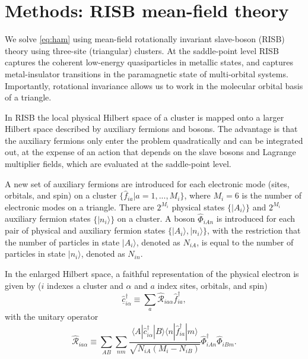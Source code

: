 \documentclass[reprint,aps,prb,amsmath,amssymb]{revtex4-2}
\begin{document}

\section{Methods: RISB mean-field theory} \label{sec:risb}

We solve \cref{eq:ham} using mean-field rotationally invariant slave-boson (RISB) theory \cite{Kotliar1986,Lechermann2007,Lanata2015,Lanata2017} using three-site (triangular) clusters. At the saddle-point level RISB captures the coherent low-energy quasiparticles in metallic states, and captures metal-insulator transitions in the paramagnetic state of multi-orbital systems. Importantly, rotational invariance allows us to work in the molecular orbital basis of a triangle.  %

In RISB the local physical Hilbert space of a cluster is mapped onto a larger Hilbert space described by auxiliary fermions and bosons. The advantage is that the auxiliary fermions only enter the problem quadratically and can be integrated out, at the expense of an action that depends on the slave bosons and Lagrange multiplier fields, which are evaluated at the saddle-point level. 

A new set of auxiliary fermions are introduced for each electronic mode (sites, orbitals, and spin) on a cluster $\{\hat{f}_{ia} | a = 1, ..., M_i \}$, where $M_i = 6$ is the number of electronic modes on a triangle. There are $2^{M_i}$ physical states $\{|A_i\rangle \}$ and $2^{M_i}$ auxiliary fermion states $\{|n_i \rangle \}$ on a cluster. A boson $\hat{\Phi}_{iAn}$ is introduced for each pair of physical and auxiliary fermion states $\{ |A_i \rangle, |n_i \rangle \}$, with the restriction that the number of particles in state $|A_i \rangle$, denoted as $N_{iA}$, is equal to the number of particles in state $|n_i \rangle$, denoted as $N_{in}$.

In the enlarged Hilbert space, a faithful representation of the physical electron is given by ($i$ indexes a cluster and $\alpha$ and $a$ index sites, orbitals, and spin)
%
\begin{equation} \label{eq:sb-electron}
	\underline{\hat{c}}_{i\alpha}^{\dagger} \equiv \sum_a \hat{\mathcal{R}}_{ia\alpha}^{} \hat{f}_{ia}^{\dagger},
\end{equation}
%
with the unitary operator
%
\begin{equation}
\hat{\mathcal{R}}_{ia\alpha} \equiv \sum_{AB} \sum_{nm} \frac{\langle A| \hat{c}_{i\alpha}^{\dagger} |B\rangle \langle n| \hat{f}_{ia}^{\dagger} | m \rangle }{\sqrt{N_{iA}(M_i - N_{iB})}} \hat{\Phi}_{iAn}^{\dagger} \hat{\Phi}_{iBm}^{}.
\end{equation}
\end{document}
